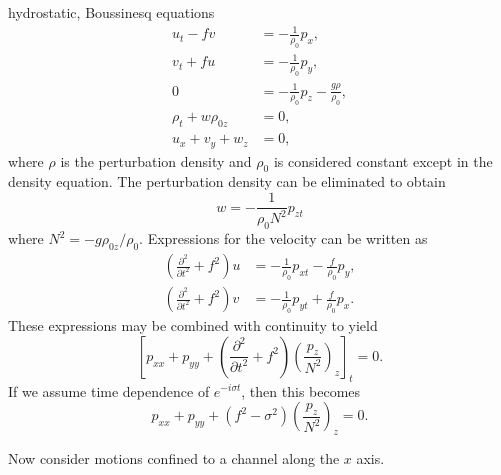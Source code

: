 hydrostatic, Boussinesq equations
\begin{align*}
	u_t-fv            & =-\frac{1}{\rho_0}p_x,                      \\
	v_t+fu            & =-\frac{1}{\rho_0}p_y,                      \\
	0                 & =-\frac{1}{\rho_0}p_z-\frac{g\rho}{\rho_0}, \\
	\rho_t+w\rho_{0z} & =0,                                         \\
	u_x+v_y+w_z       & =0,
\end{align*}
where $\rho$ is the perturbation density and $\rho_0$ is considered constant except in
the density equation. The perturbation density can be eliminated to obtain
\[
	w=-\frac{1}{\rho_0N^2}p_{zt}
\]
where $N^2=-g\rho_{0z}/\rho_0$. Expressions for the velocity can be written as
\begin{align*}
	\left(\frac{\partial^2}{\partial t^2}+f^2\right)u
	 & =-\frac{1}{\rho_0}p_{xt}-\frac{f}{\rho_0}p_y, \\
	\left(\frac{\partial^2}{\partial t^2}+f^2\right)v
	 & =-\frac{1}{\rho_0}p_{yt}+\frac{f}{\rho_0}p_x.
\end{align*}
These expressions may be combined with continuity to yield
\[
	\left[
		p_{xx}+p_{yy}
		+\left(\frac{\partial^2}{\partial t^2}+f^2\right)
		\left(\frac{p_z}{N^2}\right)_z
		\right]_t=0.
\]
If we assume time dependence of $e^{-i\sigma t}$, then this becomes
\[
	p_{xx}+p_{yy}+(f^2-\sigma^2)
	\left(\frac{p_z}{N^2}\right)_z=0.
\]

Now consider motions confined to a channel along the $x$ axis.

\sourcepagebreak


